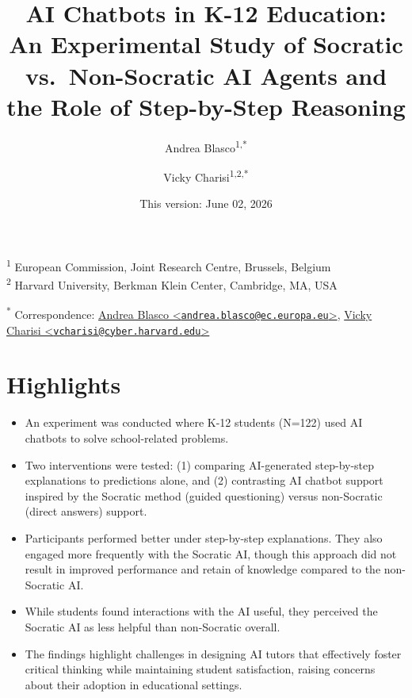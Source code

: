 \documentclass[
  11pt,
]{article}
\title{AI Chatbots in K-12 Education: An Experimental Study of Socratic vs.~Non-Socratic AI Agents and the Role of Step-by-Step Reasoning}
\author{Andrea Blasco\textsuperscript{1,*} \and Vicky Charisi\textsuperscript{1,2,*}}
\date{This version: June 02, 2026}
\begin{document}
\maketitle

\textsuperscript{1} European Commission, Joint Research Centre, Brussels, Belgium\\
\textsuperscript{2} Harvard University, Berkman Klein Center, Cambridge, MA, USA

\textsuperscript{*} Correspondence: \href{mailto:andrea.blasco@ec.europa.eu}{Andrea Blasco \textless{}\href{mailto:andrea.blasco@ec.europa.eu}{\nolinkurl{andrea.blasco@ec.europa.eu}}\textgreater{}}, \href{mailto:vcharisi@cyber.harvard.edu}{Vicky Charisi \textless{}\href{mailto:vcharisi@cyber.harvard.edu}{\nolinkurl{vcharisi@cyber.harvard.edu}}\textgreater{}}

\section*{Highlights}\label{highlights}

\begin{itemize}
\item
  An experiment was conducted where K-12 students (N=122) used AI chatbots to solve school-related problems.
\item
  Two interventions were tested: (1) comparing AI-generated step-by-step explanations to predictions alone, and (2) contrasting AI chatbot support inspired by the Socratic method (guided questioning) versus non-Socratic (direct answers) support.
\end{itemize}

\begin{itemize}
\item
  Participants performed better under step-by-step explanations. They also engaged more frequently with the Socratic AI, though this approach did not result in improved performance and retain of knowledge compared to the non-Socratic AI.
\item
  While students found interactions with the AI useful, they perceived the Socratic AI as less helpful than non-Socratic overall.
\item
  The findings highlight challenges in designing AI tutors that effectively foster critical thinking while maintaining student satisfaction, raising concerns about their adoption in educational settings.
\end{itemize}
\end{document}
